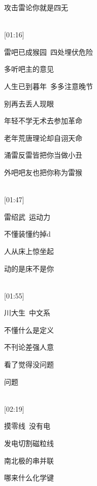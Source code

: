 \documentclass[UTF8,12pt,oneside]{ctexbook}
\begin{document}
\begin{center}
            攻击雷论你就是四无
            
            ~\\
            
            [01:16]
            
            雷吧已成猴园\ 四处埋伏危险
            
            多听吧主的意见
            
            人生已到暮年\ 多多注意晚节
            
            别再去丢人现眼
            
            年轻不学无术去参加革命
            
            老年荒唐理论却自诩天命
            
            涌雷反雷皆把你当做小丑
            
            外吧吧友也把你称为雷猴
            
            ~\\
            
            [01:47]
            
            雷绍武\ 运动力
            
            不懂装懂约掉d
            
            人从床上惊坐起
            
            动的是床不是你
            
            ~\\
            
            [01:55]
            
            川大生\ 中文系
            
            不懂什么是定义
            
            不刊论差强人意
            
            看了觉得没问题
            
            问题
            
            ~\\
            
            [02:19]
            
            摸零线\ 没有电
            
            发电切割磁粒线
            
            南北极的串并联
            
            哪来什么化学键
            
            ~\\
            

\end{center}
\end{document}
